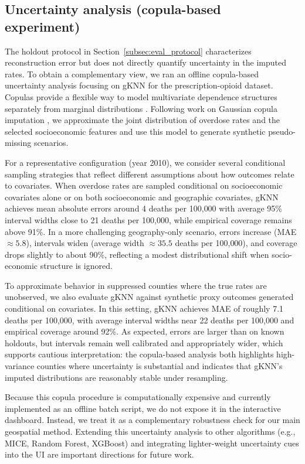 \documentclass[review]{vgtc}
\begin{document}
\vspace{-6pt}
\subsection{Uncertainty analysis (copula-based experiment)}
\label{subsec:uncertainty}
The holdout protocol in Section~\ref{subsec:eval_protocol} characterizes reconstruction error but does not directly quantify uncertainty in the imputed rates. To obtain a complementary view, we ran an offline copula-based uncertainty analysis focusing on gKNN for the prescription-opioid dataset. Copulas provide a flexible way to model multivariate dependence structures separately from marginal distributions \cite{nelsen2006introduction,joe2014dependence}. Following work on Gaussian copula imputation \cite{hollenbach2021multiple}, we approximate the joint distribution of overdose rates and the selected socioeconomic features and use this model to generate synthetic pseudo-missing scenarios.

For a representative configuration (year 2010), we consider several conditional sampling strategies that reflect different assumptions about how outcomes relate to covariates. When overdose rates are sampled conditional on socioeconomic covariates alone or on both socioeconomic and geographic covariates, gKNN achieves mean absolute errors around 4 deaths per 100{,}000 with average 95\% interval widths close to 21 deaths per 100{,}000, while empirical coverage remains above 91\%. In a more challenging geography-only scenario, errors increase (MAE $\approx 5.8$), intervals widen (average width $\approx 35.5$ deaths per 100{,}000), and coverage drops slightly to about 90\%, reflecting a modest distributional shift when socio-economic structure is ignored.

To approximate behavior in suppressed counties where the true rates are unobserved, we also evaluate gKNN against synthetic proxy outcomes generated conditional on covariates. In this setting, gKNN achieves MAE of roughly 7.1 deaths per 100{,}000, with average interval widths near 22 deaths per 100{,}000 and empirical coverage around 92\%. As expected, errors are larger than on known holdouts, but intervals remain well calibrated and appropriately wider, which supports cautious interpretation: the copula-based analysis both highlights high-variance counties where uncertainty is substantial and indicates that gKNN's imputed distributions are reasonably stable under resampling.

Because this copula procedure is computationally expensive and currently implemented as an offline batch script, we do not expose it in the interactive dashboard. Instead, we treat it as a complementary robustness check for our main geospatial method. Extending this uncertainty analysis to other algorithms (e.g., MICE, Random Forest, XGBoost) and integrating lighter-weight uncertainty cues into the UI are important directions for future work.
\vspace{-4pt}
\end{document}
